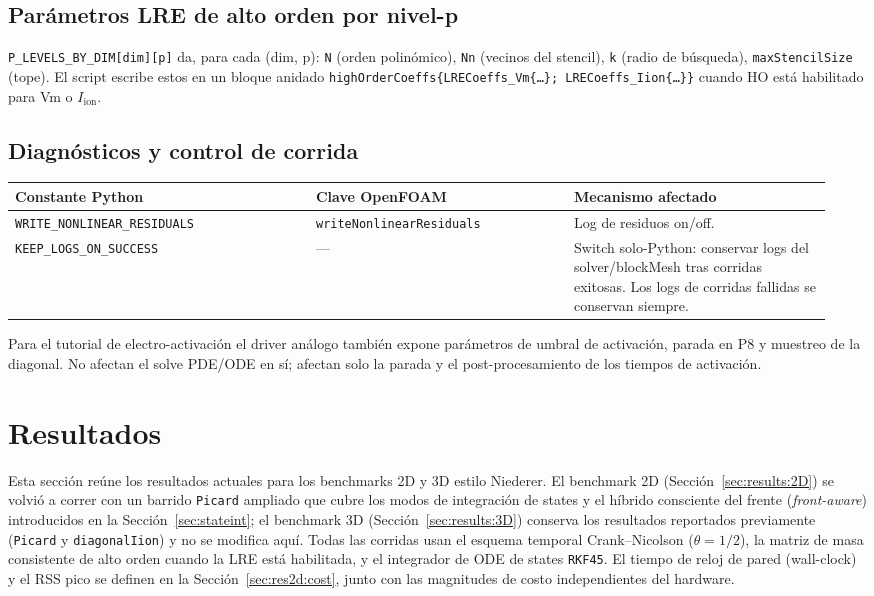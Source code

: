 \documentclass[11pt,a4paper]{article}
\newcommand{\code}[1]{\texttt{\small #1}}
\newcommand{\Iion}{I_{\mathrm{ion}}}
\begin{document}
\subsection{Parámetros LRE de alto orden por nivel-p}
\code{P\_LEVELS\_BY\_DIM[dim][p]} da, para cada (dim, p):
\code{N} (orden polinómico), \code{Nn} (vecinos del stencil),
\code{k} (radio de búsqueda), \code{maxStencilSize} (tope). El script escribe estos
en un bloque anidado
\code{highOrderCoeffs\{LRECoeffs\_Vm\{\dots\}; LRECoeffs\_Iion\{\dots\}\}}
cuando HO está habilitado para Vm o $\Iion$.

\subsection{Diagnósticos y control de corrida}
\begin{longtable}{@{}p{0.35\linewidth}p{0.30\linewidth}p{0.30\linewidth}@{}}
\toprule
Constante Python & Clave OpenFOAM & Mecanismo afectado \\
\midrule \endhead
\code{WRITE\_NONLINEAR\_RESIDUALS} &
   \code{writeNonlinearResiduals} & Log de residuos on/off. \\
\code{KEEP\_LOGS\_ON\_SUCCESS} & --- &
   Switch solo-Python: conservar logs del solver/blockMesh tras corridas exitosas.
   Los logs de corridas fallidas se conservan siempre. \\
\bottomrule
\end{longtable}

Para el tutorial de electro-activación el driver análogo también expone parámetros de
umbral de activación, parada en P8 y muestreo de la diagonal. No afectan el solve
PDE/ODE en sí; afectan solo la parada y el post-procesamiento de los tiempos de
activación.

\section{Resultados}
\label{sec:results}

Esta sección reúne los resultados actuales para los benchmarks 2D y 3D
estilo Niederer. El benchmark 2D (Sección~\ref{sec:results:2D}) se volvió a correr
con un barrido \code{Picard} ampliado que cubre los modos de integración de states y
el híbrido consciente del frente (\emph{front-aware}) introducidos en la
Sección~\ref{sec:stateint}; el benchmark 3D (Sección~\ref{sec:results:3D}) conserva
los resultados reportados previamente (\code{Picard} y \code{diagonalIion}) y no se
modifica aquí. Todas las corridas usan el esquema temporal Crank--Nicolson
($\theta = 1/2$), la matriz de masa consistente de alto orden cuando la LRE está
habilitada, y el integrador de ODE de states \code{RKF45}. El tiempo de reloj de
pared (wall-clock) y el RSS pico se definen en la Sección~\ref{sec:res2d:cost}, junto
con las magnitudes de costo independientes del hardware.
\end{document}
